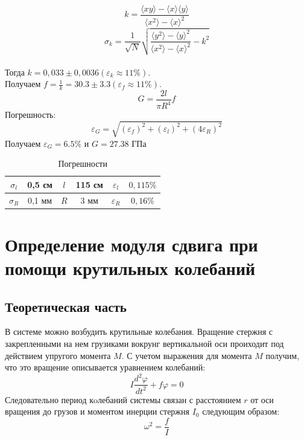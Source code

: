 \documentclass[a4paper]{article}
\begin{document}
\[k=\frac{\langle xy\rangle-\langle x\rangle \langle y\rangle}{\langle x^2\rangle - \langle x\rangle^2}\]
\[\sigma_{k} = \frac{1}{\sqrt{N}}\sqrt{\frac{\langle y^2 \rangle - \langle y \rangle ^2}{\langle x^2 \rangle - \langle x \rangle ^2} - k^2}\]\\
Тогда $k = 0,033 \pm 0,0036 (\varepsilon_{k} \approx 11\%)$.\\
Получаем $f = \frac{1}{k} = 30.3 \pm 3.3 (\varepsilon_{f} \approx 11\%)$.
\[
    G=\frac{2l}{\pi R^{4}}f
\]
Погрешность:
\[
    \varepsilon_{G} = \sqrt{(\varepsilon_{f})^2 + (\varepsilon_{l})^2 + (4\varepsilon_{R})^2} 
\]
Получаем $\varepsilon_{G} = 6.5\%$ и $G = 27.38$ ГПа

\begin{table}[h!]
\begin{center}
\begin{tabular}{|c|c|c|c|c|c|}
\hline
$\sigma_{l}$ & 0,5 см & $l$ & 115 см    & $\varepsilon_{l}$ & $0,115\%$ \\ \hline
$\sigma_{R}$ & 0,1 мм   & $R$ & 3 мм    & $\varepsilon_{R}$ & $0,16\%$  \\ \hline
\end{tabular}
\caption{Погрешности}
\end{center}
\end{table}





\newpage
\section{Определение модуля сдвига при помощи крутильных колебаний}

\subsection{Теоретическая часть}

В системе можно возбудить крутильные колебания. Вращение стержня с закрепленными
на нем грузиками вокрунг вертикальной оси проиходит под действием упругого момента $M$.
С учетом выражения для момента $M$ получим, что это вращение описывается уравнением колебаний:
\begin{equation}
    I\frac{d^2 \varphi }{d t^2} + f \varphi =0
\end{equation}
Следовательно период кoлебаний системы связан с расстоянием $r$ от оси вращения до грузов и
моментом инерции стержня $I_0$ следующим образом:
\begin{equation}
    \omega^2 = \frac{f}{I}
\end{equation}
\end{document}
